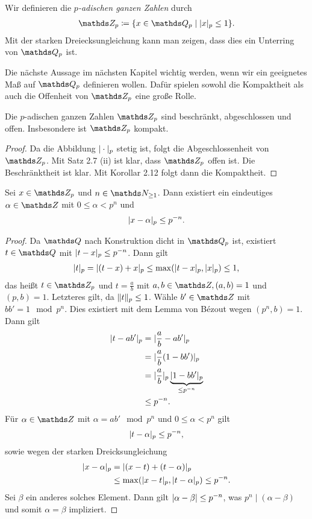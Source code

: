 \begin{defi}
Wir definieren die \emph{$p$-adischen ganzen Zahlen} durch
\begin{align*}
\Z_p\coloneqq \{x\in \Q_p \mid \abs{x}_p \leq 1\}.
\end{align*}
Mit der starken Dreiecksungleichung kann man zeigen, dass dies ein
Unterring von $\Q_p$ ist.
\end{defi}

Die nächste Aussage im nächsten Kapitel wichtig werden, wenn wir ein geeignetes Maß auf $\Q_p$ definieren wollen.
Dafür spielen sowohl die Kompaktheit als auch die Offenheit von $\Z_p$ eine große Rolle.

\begin{satz}
Die $p$-adischen ganzen Zahlen $\Z_p$ sind beschränkt, abgeschlossen und offen.
Insbesondere ist $\Z_p$ kompakt.
\end{satz}
\begin{proof}
Da die Abbildung $|\cdot|_p$ stetig ist, folgt die Abgeschlossenheit von $\Z_p$.
Mit Satz 2.7 (ii) ist klar, dass $\Z_p$ offen ist.
Die Beschränktheit ist klar.
Mit Korollar 2.12 folgt dann die Kompaktheit.
\end{proof}


\begin{satz}
Sei $x\in \Z_p$ und $n\in \N_{\geq 1}$.
Dann existiert ein eindeutiges $\alpha \in \Z$ mit $0\leq \alpha <p^n$ und
\begin{align*}
|x-\alpha|_p\leq p^{-n}.
\end{align*}
\begin{proof}
Da $\Q$ nach Konstruktion dicht in $\Q_p$ ist, existiert $t \in \Q$ mit $|t-x|_p \leq p^{-n}$.
Dann gilt
\begin{align*}
|t|_p=|(t-x)+x|_p \leq \max(|t-x|_p,|x|_p) \leq 1,
\end{align*}
das heißt $t \in \Z_p$ und $t=\frac{a}{b}$ mit $a,b\in \Z, (a,b)=1$ und $(p,b)=1$. Letzteres gilt, da $\|t\|_p\leq 1$. 
Wähle $b'\in \Z$ mit $bb'=1 \mod p^n$. Dies existiert mit dem Lemma von Bézout wegen $(p^n,b)=1$.
Dann gilt
\begin{align*}
|t-ab'|_p&=|\frac{a}{b}-ab'|_p\\
&=|\frac{a}{b}(1-bb')|_p\\
&=|\frac{a}{b}|_p \underbrace{|1-bb'|_p}_{\leq p^{-n}}\\
&\leq p^{-n}.
\end{align*}
Für $\alpha \in \Z$ mit $\alpha=ab' \mod p^n$ und $0 \leq \alpha <p^n$ gilt
\begin{align*}
|t-\alpha|_p\leq p^{-n},
\end{align*}
sowie wegen der starken Dreicksungleichung
\begin{align*}
|x-\alpha|_p &=|(x-t)+(t-\alpha)|_p\\
&\leq \max (|x-t|_p,|t-\alpha|_p)\leq p^{-n}.
\end{align*}
Sei $\beta$ ein anderes solches Element. Dann gilt $|\alpha-\beta|\leq p^{-n}$, was $p^n\mid (\alpha-\beta)$ und somit $\alpha=\beta$ impliziert.
\end{proof}
\end{satz}

